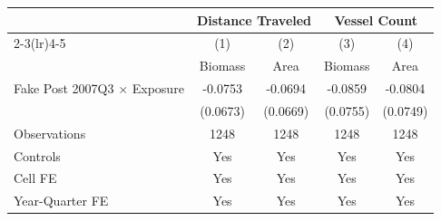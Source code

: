 \def\sym#1{\ifmmode^{#1}\else\(^{#1}\)\fi}
\begin{tabular}{l*{4}{c}}
\hline\hline
                    &\multicolumn{2}{c}{Distance Traveled}&\multicolumn{2}{c}{Vessel Count}\\
                    \cmidrule(lr){2-3}\cmidrule(lr){4-5}
                    &\multicolumn{1}{c}{(1)}&\multicolumn{1}{c}{(2)}&\multicolumn{1}{c}{(3)}&\multicolumn{1}{c}{(4)}\\
                    &\multicolumn{1}{c}{Biomass}&\multicolumn{1}{c}{Area}&\multicolumn{1}{c}{Biomass}&\multicolumn{1}{c}{Area}\\
\hline
Fake Post 2007Q3 $\times$ Exposure&    -0.0753&    -0.0694&    -0.0859&    -0.0804\\
                    &             (0.0673)&             (0.0669)&             (0.0755)&             (0.0749)\\
[1em]
Observations        &        1248         &        1248         &        1248         &        1248         \\
Controls            &         Yes         &         Yes         &         Yes         &         Yes         \\
Cell FE             &         Yes         &         Yes         &         Yes         &         Yes         \\
Year-Quarter FE     &         Yes         &         Yes         &         Yes         &         Yes         \\
\hline\hline
\end{tabular}